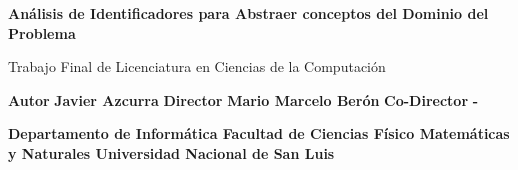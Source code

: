\documentclass[a4paper,12pt]{report}
\begin{document}
\begin{titlepage}
    \centering
    \vfill
    {\bfseries\huge
	Análisis de Identificadores para Abstraer conceptos del 		Dominio del Problema
     \vskip1.3cm       
   }  
   
{\bfseries\Large

Trabajo Final de Licenciatura en Ciencias de la Computación
\vskip1cm
}

 {\bfseries\large
	Autor
	\vskip0.1cm   
   }
   {\bfseries\Large
Javier Azcurra
   \vskip1cm
   }
   {\bfseries\large
	Director
	\vskip0.1cm   
   }
   {\bfseries\Large
Mario Marcelo Berón
   \vskip1cm
   }
   {\bfseries\large
	Co-Director
	\vskip0.1cm   
   }
   {\bfseries\Large
-
   \vskip1cm
   }

{\bfseries\large
Departamento de Informática
\vskip0.5cm
Facultad de Ciencias Físico Matemáticas y Naturales
\vskip0.5cm
Universidad Nacional de San Luis
}     
  
\end{titlepage}

\end{document}
